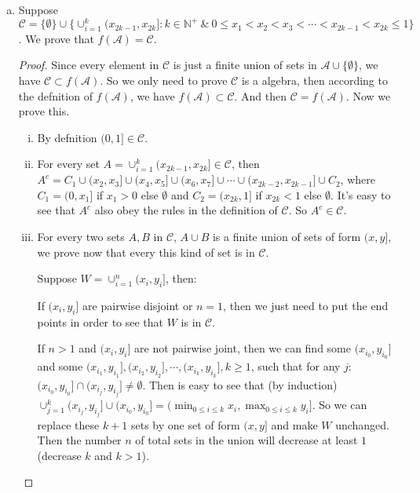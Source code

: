 \documentclass[11pt]{article}
\begin{document}
\begin{enumerate}[1.]
\begin{enumerate}[(a)]
        \item
        Suppose $\mathcal{C} = \{\emptyset\} \cup \{\cup_{i=1}^k (x_{2k-1}, x_{2k}] : k \in \mathbb{N}^+\ \& \ 0 \le x_1 < x_2 < x_3 < \cdots < x_{2k-1} < x_{2k} \le 1\}$.
        We prove that $f(\mathcal{A}) = \mathcal{C}$.
        \begin{proof}
            Since every element in $\mathcal{C}$ is just a finite union of sets in $\mathcal{A} \cup \{\emptyset\}$, we have $\mathcal{C} \subset f(\mathcal{A})$.
            So we only need to prove $\mathcal{C}$ is a algebra, then according to the defnition of $f(\mathcal{A})$, we have $f(\mathcal{A}) \subset \mathcal{C}$.
            And then $\mathcal{C} = f(\mathcal{A})$. Now we prove this.
            \begin{enumerate}[i.]
                \item By defnition $(0,1] \in \mathcal{C}$.
                \item For every set $A = \cup_{i=1}^k (x_{2k-1}, x_{2k}] \in \mathcal{C}$, then $A^c = C_1 \cup (x_2,x_3] \cup (x_4,x_5] \cup (x_6,x_7] \cup \cdots \cup (x_{2k-2},x_{2k-1}] \cup C_2$, where $C_1 = (0,x_1]$ if $x_1 > 0$ else $\emptyset$ and $C_2 = (x_{2k},1]$ if $x_{2k} < 1$ else $\emptyset$.
                It's easy to see that $A^c$ also obey the rules in the definition of $\mathcal{C}$.
                So $A^c \in \mathcal{C}$.
                \item For every two sets $A, B$ in $\mathcal{C}$, $A \cup B$ is a finite union of sets of form $(x,y]$, we prove now that every this kind of set is in $\mathcal{C}$.

                Suppose $W = \cup_{i=1}^n (x_i, y_i]$, then:
                
                If $(x_i, y_i]$ are pairwise disjoint or $n = 1$, then we just need to put the end points in order to see that $W$ is in $\mathcal{C}$.
                
                If $n > 1$ and $(x_i, y_i]$ are not pairwise joint, then we can find some $(x_{i_0},y_{i_0}]$ and some $(x_{i_1},y_{i_1}],(x_{i_2},y_{i_2}], \cdots ,(x_{i_k},y_{i_k}], k \ge 1$, such that for any $j$: $(x_{i_0},y_{i_0}] \cap (x_{i_j},y_{i_j}] \neq \emptyset$.
                Then is easy to see that (by induction) $\cup_{j=1}^k (x_{i_j},y_{i_j}] \cup (x_{i_0},y_{i_0}] = (\min_{0\le i \le k} x_i, \max_{0\le i \le k} y_i]$. So we can replace these $k+1$ sets by one set of form $(x,y]$ and make $W$ unchanged. Then the number $n$ of total sets in the union will decrease at least $1$ (decrease $k$ and $k > 1$). 
                

\end{enumerate}
\end{proof}
\end{enumerate}
\end{enumerate}
\end{document}
